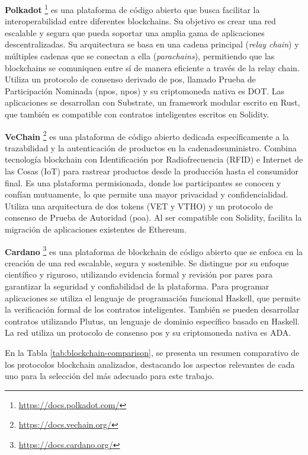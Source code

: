 \textbf{Polkadot} \footnote{\url{https://docs.polkadot.com/}}
es una plataforma de código abierto que busca facilitar la interoperabilidad entre diferentes blockchains. Su objetivo es crear una red escalable y segura que pueda soportar una amplia gama de aplicaciones descentralizadas. Su arquitectura se basa en una cadena principal (\textit{relay chain}) y múltiples cadenas que se conectan a ella (\textit{parachains}), permitiendo que las blockchains se comuniquen entre sí de manera eficiente a través de la relay chain. Utiliza un protocolo de consenso derivado de \acrshort{pos}, llamado Prueba de Participación Nominada (\acrshort{npos}, \acrlong{npos}) y su \gls{criptomoneda} nativa es DOT. Las aplicaciones se desarrollan con Substrate, un framework modular escrito en Rust, que también es compatible con contratos inteligentes escritos en Solidity.

\textbf{VeChain} \footnote{\url{https://docs.vechain.org/}}
es una plataforma de código abierto dedicada específicamente a la trazabilidad y la autenticación de productos en la \gls{cadenadesuministro}. Combina tecnología blockchain con Identificación por Radiofrecuencia (RFID) e Internet de las Cosas (IoT) para rastrear productos desde la producción hasta el consumidor final. Es una plataforma permisionada, donde los participantes se conocen y confían mutuamente, lo que permite una mayor privacidad y confidencialidad. Utiliza una arquitectura de dos \glspl{token} (VET y VTHO) y un protocolo de consenso de Prueba de Autoridad (\acrshort{poa}). Al ser compatible con Solidity, facilita la migración de aplicaciones existentes de Ethereum.

\textbf{Cardano} \footnote{\url{https://docs.cardano.org/}}
es una plataforma de blockchain de código abierto que se enfoca en la creación de una red escalable, segura y sostenible. Se distingue por su enfoque científico y riguroso, utilizando evidencia formal y revisión por pares para garantizar la seguridad y confiabilidad de la plataforma. Para programar aplicaciones se utiliza el lenguaje de programación funcional Haskell, que permite la verificación formal de los contratos inteligentes. También se pueden desarrollar contratos utilizando Plutus, un lenguaje de dominio específico basado en Haskell. La red utiliza un protocolo de consenso \acrshort{pos} y su \gls{criptomoneda} nativa es ADA.

En la Tabla \ref{tab:blockchain-comparison}, se presenta un resumen comparativo de los protocolos blockchain analizados, destacando los aspectos relevantes de cada uno para la selección del más adecuado para este trabajo.


